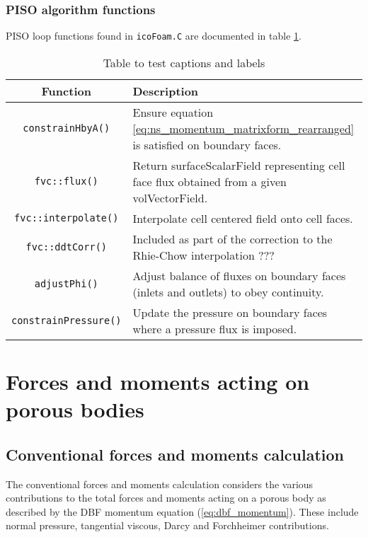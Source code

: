 \documentclass[a4paper,11pt]{report}
\begin{document}
\subsection{PISO algorithm functions}
PISO loop functions found in \texttt{icoFoam.C} are documented in table \ref{table:piso_loop_functions}.
\begin{table}[ht]
\begin{center}
\begin{tabularx}{\textwidth}{ c | p{105mm} }
    Function & Description \\
    \hline\hline
    \texttt{constrainHbyA()} & Ensure equation \ref{eq:ns_momentum_matrixform_rearranged} is satisfied on boundary faces.\\
    \hline
    \texttt{fvc::flux()} & Return surfaceScalarField representing cell face flux obtained from a given volVectorField. \\
    \hline
    \texttt{fvc::interpolate()} & Interpolate cell centered field onto cell faces. \\
    \hline
    \texttt{fvc::ddtCorr()} & Included as part of the correction to the Rhie-Chow interpolation \cite{Rhie1983}???\\
    \hline
    \texttt{adjustPhi()} & Adjust balance of fluxes on boundary faces (inlets and outlets) to obey continuity. \\
    \hline
    \texttt{constrainPressure()} & Update the pressure on boundary faces where a pressure flux is imposed. \\
\end{tabularx}
\end{center}
\caption{Table to test captions and labels}
\label{table:piso_loop_functions}
\end{table}

\chapter{Forces and moments acting on porous bodies}
\section{Conventional forces and moments calculation}
The conventional forces and moments calculation considers the various contributions to the total forces and moments acting on a porous body as described by the DBF momentum equation (\ref{eq:dbf_momentum}). These include normal pressure, tangential viscous, Darcy and Forchheimer contributions.
\end{document}
